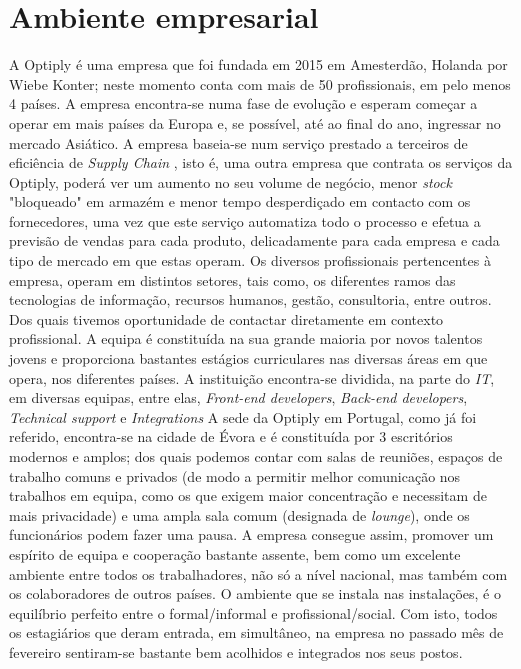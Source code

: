 \documentclass{article}
\begin{document}
\section{Ambiente empresarial}
\label{sec:amb-emp}
\hspace*{0.5cm} A Optiply é uma empresa que foi fundada em 2015 em Amesterdão, Holanda por Wiebe Konter; neste momento conta com mais de 50 profissionais, em pelo menos 4 países. A empresa encontra-se numa fase de evolução e esperam começar a operar em mais países da Europa e, se possível, até ao final do ano, ingressar no mercado Asiático. A empresa baseia-se num serviço prestado a terceiros de eficiência de \emph{Supply Chain} \cite{supp-chain}, isto é, uma outra empresa que contrata os serviços da Optiply, poderá ver um aumento no seu volume de negócio, menor \emph{stock} "bloqueado" em armazém e menor tempo desperdiçado em contacto com os fornecedores, uma vez que este serviço automatiza todo o processo e efetua a previsão de vendas para cada produto, delicadamente para cada empresa e cada tipo de mercado em que estas operam. \newline
\hspace*{0.5cm} Os diversos profissionais pertencentes à empresa, operam em distintos setores, tais como, os diferentes ramos das tecnologias de informação, recursos humanos, gestão, consultoria, entre outros. Dos quais tivemos oportunidade de contactar diretamente em contexto profissional. A equipa é constituída na sua grande maioria por novos talentos jovens e proporciona bastantes estágios curriculares nas diversas áreas em que opera, nos diferentes países. A instituição encontra-se dividida, na parte do \emph{IT}, em diversas equipas, entre elas, \emph{Front-end developers}, \emph{Back-end developers}, \emph{Technical support} e \emph{Integrations}\newline
\hspace*{0.5cm} A sede da Optiply em Portugal, como já foi referido, encontra-se na cidade de Évora e é constituída por 3 escritórios modernos e amplos; dos quais podemos contar com salas de reuniões, espaços de trabalho comuns e privados (de modo a permitir melhor comunicação nos trabalhos em equipa, como os que exigem maior concentração e necessitam de mais privacidade) e uma ampla sala comum (designada de \emph{lounge}), onde os funcionários podem fazer uma pausa. A empresa consegue assim, promover um espírito de equipa e cooperação bastante assente, bem como um excelente ambiente entre todos os trabalhadores, não só a nível nacional, mas também com os colaboradores de outros países. O ambiente que se instala nas instalações, é o equilíbrio perfeito entre o formal/informal e profissional/social. Com isto, todos os estagiários que deram entrada, em simultâneo, na empresa no passado mês de fevereiro sentiram-se bastante bem acolhidos e integrados nos seus postos. \newline
\end{document}
